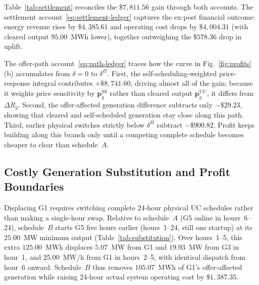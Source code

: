 \documentclass[journal]{IEEEtran}
\newcommand{\bp}{\bm p}
\newcommand{\UC}{\mathrm{UC}}
\newcommand{\SSched}{\mathrm{SS}}
\begin{document}
Table~\ref{tab:settlement} reconciles the $\$7{,}811.56$ gain through both accounts. The settlement account~\eqref{eq:settlement-ledger} captures the ex-post financial outcome: energy revenue rises by $\$4{,}385.61$ and operating cost drops by $\$4{,}004.31$ (with cleared output $95.00$~MWh lower), together outweighing the $\$578.36$ drop in uplift.

The offer-path account~\eqref{eq:path-ledger} traces how the curve in Fig.~\ref{fig:profits}(b) accumulates from $\delta=0$ to $\delta^{\Pi}$. First, the self-scheduling-weighted price-response integral contributes $+\$8{,}741.60$, driving almost all of the gain; because it weights price sensitivity by $\bp_g^{\SSched}$ rather than cleared output $\bp_g^{\UC}$, it differs from $\Delta R_g$. Second, the offer-affected generation difference subtracts only $-\$29.23$, showing that cleared and self-scheduled generation stay close along this path. Third, earlier physical switches strictly below $\delta^{\Pi}$ subtract $-\$900.82$. Profit keeps building along this branch only until a competing complete schedule becomes cheaper to clear than schedule~$A$.

\subsection{Costly Generation Substitution and Profit Boundaries}\label{sec:results-substitution}
Displacing G1 requires switching complete 24-hour physical UC schedules rather than making a single-hour swap. Relative to schedule~$A$ (G5 online in hours~6--24), schedule~$B$ starts G5 five hours earlier (hours~1--24, still one startup) at its $25.00$~MW minimum output (Table~\ref{tab:substitution}). Over hours~1--5, this extra $125.00$~MWh displaces $5.07$~MW from G1 and $19.93$~MW from G3 in hour~1, and $25.00$~MW/h from G1 in hours~2--5, with identical dispatch from hour~6 onward. Schedule~$B$ thus removes $105.07$~MWh of G1's offer-affected generation while raising 24-hour actual system operating cost by $\$1{,}387.35$.
\end{document}

